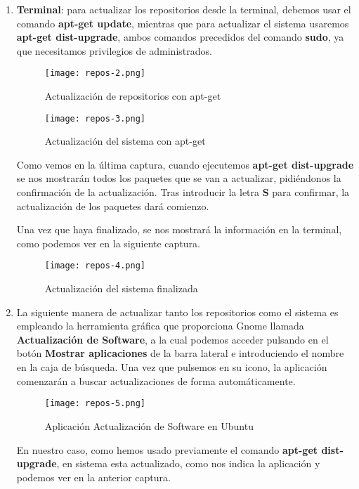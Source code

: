 \begin{enumerate}
    \item \textbf{Terminal}: para actualizar los repositorios desde la terminal, debemos usar el comando \textbf{apt-get update}, mientras que para actualizar el sistema usaremos \textbf{apt-get dist-upgrade}, ambos comandos precedidos del comando \textbf{sudo}, ya que necesitamos privilegios de administrados.

    \begin{figure}[H]
        \centering
        \texttt{[image: repos-2.png]}
        \caption{Actualización de repositorios con apt-get}
    \end{figure}

    \begin{figure}[H]
        \centering
        \texttt{[image: repos-3.png]}
        \caption{Actualización del sistema con apt-get}
    \end{figure}

    Como vemos en la última captura, cuando ejecutemos \textbf{apt-get dist-upgrade} se nos mostrarán todos los paquetes que se van a actualizar, pidiéndonos la confirmación de la actualización. Tras introducir la letra \textbf{S} para confirmar, la actualización de los paquetes dará comienzo.

    Una vez que haya finalizado, se nos mostrará la información en la terminal, como podemos ver en la siguiente captura.

    \begin{figure}[H]
        \centering
        \texttt{[image: repos-4.png]}
        \caption{Actualización del sistema finalizada}
    \end{figure}

    \item La siguiente manera de actualizar tanto los repositorios como el sistema es empleando la herramienta gráfica que proporciona Gnome llamada \textbf{Actualización de Software}, a la cual podemos acceder pulsando en el botón \textbf{Mostrar aplicaciones} de la barra lateral e introduciendo el nombre en la caja de búsqueda. Una vez que pulsemos en su icono, la aplicación comenzarán a buscar actualizaciones de forma automáticamente.

    \begin{figure}[H]
        \centering
        \texttt{[image: repos-5.png]}
        \caption{Aplicación Actualización de Software en Ubuntu}
    \end{figure}

    En nuestro caso, como hemos usado previamente el comando \textbf{apt-get dist-upgrade}, en sistema esta actualizado, como nos indica la aplicación y podemos ver en la anterior captura.
\end{enumerate}

